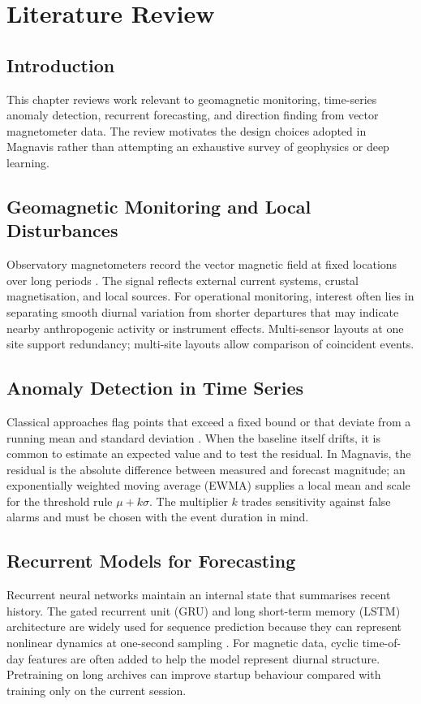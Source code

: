 \chapter{Literature Review}\doublespacing
\label{Chapter2}

\section{Introduction}
This chapter reviews work relevant to geomagnetic monitoring, time-series anomaly detection, recurrent forecasting, and direction finding from vector magnetometer data. The review motivates the design choices adopted in Magnavis rather than attempting an exhaustive survey of geophysics or deep learning.

\section{Geomagnetic Monitoring and Local Disturbances}
Observatory magnetometers record the vector magnetic field at fixed locations over long periods \citep{campbell2003introduction}. The signal reflects external current systems, crustal magnetisation, and local sources. For operational monitoring, interest often lies in separating smooth diurnal variation from shorter departures that may indicate nearby anthropogenic activity or instrument effects. Multi-sensor layouts at one site support redundancy; multi-site layouts allow comparison of coincident events.

\section{Anomaly Detection in Time Series}
Classical approaches flag points that exceed a fixed bound or that deviate from a running mean and standard deviation \citep{chandola2009anomaly}. When the baseline itself drifts, it is common to estimate an expected value and to test the residual. In Magnavis, the residual is the absolute difference between measured and forecast magnitude; an exponentially weighted moving average (EWMA) supplies a local mean and scale for the threshold rule $\mu + k\sigma$. The multiplier $k$ trades sensitivity against false alarms and must be chosen with the event duration in mind.

\section{Recurrent Models for Forecasting}
Recurrent neural networks maintain an internal state that summarises recent history. The gated recurrent unit (GRU) and long short-term memory (LSTM) architecture are widely used for sequence prediction because they can represent nonlinear dynamics at one-second sampling \citep{cho2014gru,hochreiter1997lstm,goodfellow2016deep}. For magnetic data, cyclic time-of-day features are often added to help the model represent diurnal structure. Pretraining on long archives can improve startup behaviour compared with training only on the current session.


